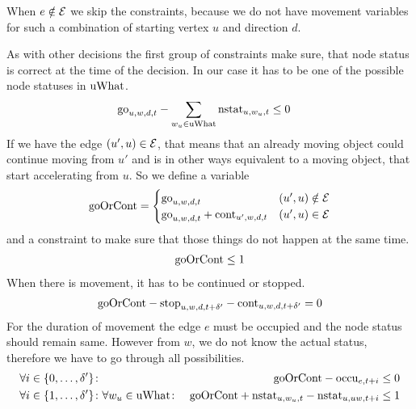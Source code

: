 When $e \notin \mathcal{E}$ we skip the constraints, because we do not have movement
variables for such a combination of starting vertex $u$ and direction $d$.

As with other decisions the first group of constraints make sure, that node
status is correct at the time of the decision. In our case it has to be one of
the possible node statuses in $\mathrm{uWhat}$.
\begin{align}
    & \mathrm{go}_{u,w,d,t} - \sum_{w_u \in \mathrm{uWhat}} \mathrm{nstat}_{u,w_u,t} \leq 0
\end{align}
If we have the edge $(u',u) \in \mathcal{E}$, that means that an already moving object
could continue moving from $u'$ and is in other ways equivalent to a moving
object, that start accelerating from $u$. So we define a variable
\begin{align*}
    \mathrm{goOrCont} = \begin{cases}
        \mathrm{go}_{u,w,d,t} & (u',u) \notin \mathcal{E}\\
        \mathrm{go}_{u,w,d,t} + \mathrm{cont}_{u',w,d,t} & (u',u) \in \mathcal{E}
    \end{cases}
\end{align*}
and a constraint to make sure that those things do not happen at the same time.
\begin{align}
    \mathrm{goOrCont} \leq 1
\end{align}
When there is movement, it has to be continued or stopped.
\begin{align}
    \mathrm{goOrCont} - \mathrm{stop}_{u,w,d,t+\delta'} - \mathrm{cont}_{u,w,d,t+\delta'} = 0
\end{align}
For the duration of movement the edge $e$ must be occupied and the node status
should remain same. However from $w$, we do not know the actual status,
therefore we have to go through all possibilities.
\begin{align}
    &\forall i \in \{0,\ldots,\delta'\}\colon & \mathrm{goOrCont} - \mathrm{occu}_{e,t+i} \leq 0\\
    &\forall i \in \{1,\ldots,\delta'\}\colon \forall w_u \in \mathrm{uWhat}\colon &
    \mathrm{goOrCont} + \mathrm{nstat}_{u,w_u,t} - \mathrm{nstat}_{u,uw,t+i} \leq 1
\end{align}

